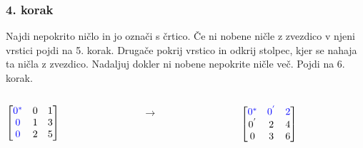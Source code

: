 \documentclass{beamer}
\begin{document}
\begin{frame}
    \frametitle{4. korak}
    \begin{block}{}
        Najdi nepokrito ničlo in jo označi s črtico. Če ni nobene ničle z zvezdico
        v njeni vrstici pojdi na 5. korak. Drugače pokrij vrstico in odkrij stolpec,
        kjer se nahaja ta ničla z zvezdico. Nadaljuj dokler ni nobene nepokrite ničle več.
        Pojdi na 6. korak.
    \end{block}
    \hfill
    \begin{columns}[t]
        \begin{column}{0.25\linewidth}
            $\begin{bmatrix}
                \textcolor{blue}{0^{*}} & 0 & 1\\
                \textcolor{blue}{0} & 1 & 3\\
                \textcolor{blue}{0} & 2 & 5\\	
            \end{bmatrix}$
        \end{column}
        \begin{column}{0.25\linewidth}
         \centering
         $ \rightarrow $
        \end{column}
        \hfill
        \begin{column}{0.25\linewidth}
            \centering
            $\begin{bmatrix}
                \textcolor{blue}{0^{*}} & \textcolor{blue}{0^{'}} & \textcolor{blue}{2}\\
                0^{'} & 2 & 4\\
                0 & 3 & 6\\	
            \end{bmatrix}$
        \end{column}
    \end{columns}
\end{frame}
\end{document}
